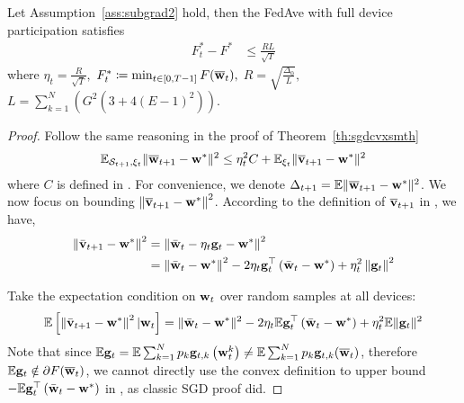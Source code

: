 \begin{theorem}
	Let Assumption~\ref{ass:subgrad2} hold, 
	then the FedAve with full device participation satisfies
	\begin{align}
		 F^*_t - F^* &\leq \frac{RL}{\sqrt{T}}
	\end{align}
	where $\eta_t = \frac{R}{\sqrt{T}},$
	$F^*_t \coloneqq \min_{t \in [0, T-1]} F(\overline{{\mathbf{w}}}_t),$
	$R = \sqrt{ \frac{\Delta_0}{L}},$
	$L=\sum_{k=1}^N \left( G^2 \left(3 + 4(E-1)^2\right)\right).$
	\label{th:cvxnonsmoth}
\end{theorem}
\begin{proof}
Follow the same reasoning in the proof of Theorem~\ref{th:sgdcvxsmth} \eq{\ref{eq:sgdcvxsmth1}}
$$\mathbb{E}_{{\mathcal{S}}_{t+1}, \xi_{t}} \|{\overline{\mathbf{w}}}_{t+1} - {\mathbf{w}}^*\|^2 \leq  \eta_t^2 C + \mathbb{E}_{\xi_t} \|\overline{{\mathbf{v}}}_{t+1} - {\mathbf{w}}^*\|^2 $$
where $C$ is defined in \eq{\ref{eq:partialsample}}. For convenience, we denote $\Delta_{t+1} = \mathbb{E} \|\overline{{\mathbf{w}}}_{t+1} - {\mathbf{w}}^*\|^2$. We now focus on bounding $\left\|{\overline{\mathbf{v}}}_{t+1}-{\mathbf{w}}^{*}\right\|^2$.
According to the definition of $\overline{{\mathbf{v}}}_{t+1}$ in \eq{\ref{eq:vbar}}, we have,
$$\begin{aligned}\left\|\bar{{\mathbf{v}}}_{t+1}-{\mathbf{w}}^{*}\right\|^2 &=\left\|\bar{{\mathbf{w}}}_{t}-\eta_{t} {\mathbf{g}}_{t}-{\mathbf{w}}^{*}\right\|^2 \\ &=\left\|\bar{{\mathbf{w}}}_{t}-{\mathbf{w}}^{*}\right\|^{2}-2 \eta_{t} {\mathbf{g}}_{t}^{\top}\left(\bar{{\mathbf{w}}}_{t}-{\mathbf{w}}^{*}\right)+\eta_{t}^{2}\left\|{\mathbf{g}}_{t}\right\|^{2} \end{aligned}$$

Take the expectation condition on ${\mathbf{w}}_t$ over random samples at all devices:
\begin{align}
\mathbb{E}\left[\left\|\bar{{\mathbf{v}}}_{t+1}-{\mathbf{w}}^{*}\right\|^2| {\mathbf{w}}_{t}\right]=\|\bar{{\mathbf{w}}}_{t}-{\mathbf{w}}^{*}\|^{2}-2 \eta_{t} \mathbb{E} {\mathbf{g}}_{t}^{\top}\left(\bar{{\mathbf{w}}}_{t}-{\mathbf{w}}^{*}\right)+\eta_{t}^{2} \mathbb{E}\| {\mathbf{g}}_{t} \|^{2}	
\label{eq:expand}
\end{align}
Note that since $\mathbb{E} {\mathbf{g}}_t = \mathbb{E} \sum_{k=1}^{N} p_{k} {\mathbf{g}}_{t, k}\left({\mathbf{w}}_{t}^{k}\right) \neq \mathbb{E} \sum_{k=1}^Np_k {\mathbf{g}}_{t,k}(\overline{{\mathbf{w}}}_t)$, therefore $\mathbb{E} {\mathbf{g}}_t \notin \partial F(\overline{{\mathbf{w}}}_t)$, we cannot directly use the convex definition to
upper bound $- \mathbb{E} {\mathbf{g}}_{t}^{\top}\left(\bar{{\mathbf{w}}}_{t}-{\mathbf{w}}^{*}\right)$ in \eq{\ref{eq:expand}}, as classic SGD proof did. 


\end{proof}
